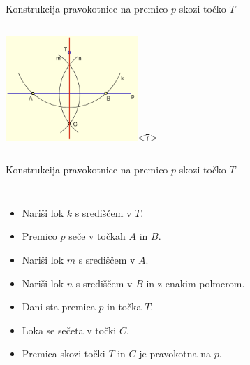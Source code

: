 \begin{frame}{Konstrukcija pravokotnice na premico $p$ skozi točko $T$}
\begin{columns}
		  \includegraphics[width=50mm]{slike/fig-7.png}<7>

	\end{columns} 

\end{frame}


\begin{frame}{Konstrukcija pravokotnice na premico $p$ skozi točko $T$}
    \begin{columns}
		  

		  \begin{itemize}[<+->]
			\item<1-> Nariši lok $k$ s središčem v $T$.
			\item<2-> Premico $p$ seče v točkah $A$ in $B$.
			\item<3-> Nariši lok $m$ s središčem v $A$.
			\item<4-> Nariši lok $n$ s središčem v $B$ in z enakim polmerom.
			\item<5-> Dani sta premica $p$ in točka $T$.
			 \item<6-> Loka se sečeta v točki $C$.
			 \item<7-> Premica skozi točki $T$ in $C$ je pravokotna na $p$.
		  \end{itemize}

	      \centering
		\end{columns}
\end{frame}
